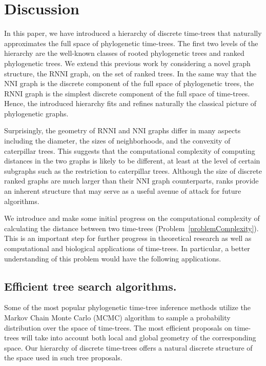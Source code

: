 \documentclass[11pt]{amsart}
\theoremstyle{definition}
\newcommand{\nni}{\mathrm{NNI}}
\newcommand{\rnni}{\mathrm{RNNI}}
\begin{document}
\section{Discussion}

In this paper, we have introduced a hierarchy of discrete time-trees that naturally approximates the full space of phylogenetic time-trees.
The first two levels of the hierarchy are the well-known classes of rooted phylogenetic trees and ranked phylogenetic trees.
We extend this previous work by considering a novel graph structure, the $\rnni$ graph, on the set of ranked trees.
In the same way that the $\nni$ graph is the discrete component of the full space of phylogenetic trees, the $\rnni$ graph is the simplest discrete component of the full space of time-trees.
Hence, the introduced hierarchy fits and refines naturally the classical picture of phylogenetic graphs.

Surprisingly, the geometry of $\rnni$ and $\nni$ graphs differ in many aspects including the diameter, the sizes of neighborhoods, and the convexity of caterpillar trees.
This suggests that the computational complexity of computing distances in the two graphs is likely to be different, at least at the level of certain subgraphs such as the restriction to caterpillar trees.
Although the size of discrete ranked graphs are much larger than their $\nni$ graph counterparts, ranks provide an inherent structure that may serve as a useful avenue of attack for future algorithms.

We introduce and make some initial progress on the computational complexity of calculating the distance between two time-trees (Problem~\ref{problemComplexity}).
This is an important step for further progress in theoretical research as well as computational and biological applications of time-trees.
In particular, a better understanding of this problem would have the following applications.


\subsection{Efficient tree search algorithms.}

Some of the most popular phylogenetic time-tree inference methods utilize the Markov Chain Monte Carlo (MCMC) algorithm to sample a probability distribution over the space of time-trees.
The most efficient proposals on time-trees will take into account both local and global geometry of the corresponding space.
Our hierarchy of discrete time-trees offers a natural discrete structure of the space used in such tree proposals.
\end{document}

